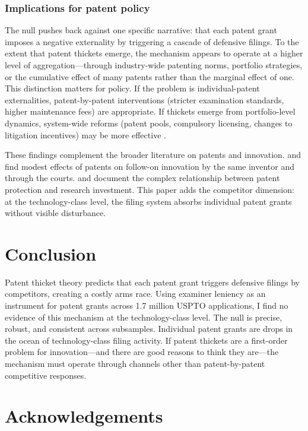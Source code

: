 \documentclass[12pt]{article}
\begin{document}
\subsubsection*{Implications for patent policy} The null pushes back against one specific narrative: that each patent grant imposes a negative externality by triggering a cascade of defensive filings. To the extent that patent thickets emerge, the mechanism appears to operate at a higher level of aggregation---through industry-wide patenting norms, portfolio strategies, or the cumulative effect of many patents rather than the marginal effect of one. This distinction matters for policy. If the problem is individual-patent externalities, patent-by-patent interventions (stricter examination standards, higher maintenance fees) are appropriate. If thickets emerge from portfolio-level dynamics, system-wide reforms (patent pools, compulsory licensing, changes to litigation incentives) may be more effective \citep{lemley2005, shapiro2001}.

These findings complement the broader literature on patents and innovation. \citet{sampat2019} and \citet{galasso2015} find modest effects of patents on follow-on innovation by the same inventor and through the courts. \citet{moser2005} and \citet{williams2017} document the complex relationship between patent protection and research investment. This paper adds the competitor dimension: at the technology-class level, the filing system absorbs individual patent grants without visible disturbance.


\section{Conclusion}

Patent thicket theory predicts that each patent grant triggers defensive filings by competitors, creating a costly arms race. Using examiner leniency as an instrument for patent grants across 1.7 million USPTO applications, I find no evidence of this mechanism at the technology-class level. The null is precise, robust, and consistent across subsamples. Individual patent grants are drops in the ocean of technology-class filing activity. If patent thickets are a first-order problem for innovation---and there are good reasons to think they are---the mechanism must operate through channels other than patent-by-patent competitive responses.

\section*{Acknowledgements}
\end{document}

